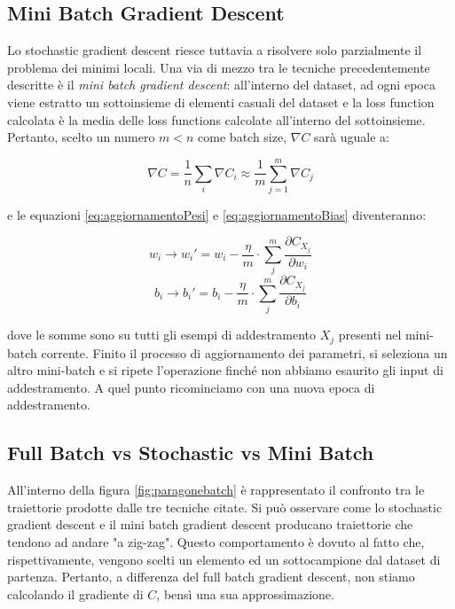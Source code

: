 \subsection{Mini Batch Gradient Descent}
Lo stochastic gradient descent riesce tuttavia a risolvere solo parzialmente il 
problema dei minimi locali.
Una via di mezzo tra le tecniche precedentemente descritte è il \textit{mini batch 
gradient descent}\cite{GradientDescent_NeuralNetworks, LearningRate_optimizer}: all’interno del dataset, ad ogni epoca viene estratto un 
sottoinsieme di elementi casuali del dataset e la loss function calcolata è la media 
delle loss functions calcolate all’interno del sottoinsieme. Pertanto, scelto 
un numero $m < n$ come batch size, $\nabla C$ sarà uguale a:

\begin{equation}
    \nabla C = \frac{1}{n}\sum_{i} \nabla C_i \approx \frac{1}{m}\sum_{j=1}^{m} \nabla C_j
\end{equation}

e le equazioni \eqref{eq:aggiornamentoPesi} e \eqref{eq:aggiornamentoBias} 
diventeranno:

\begin{equation}
    w_i \to w_i' = w_i - \frac{\eta}{m} \cdot \sum_{j}^{m} \frac{\partial C_{X_j}}{\partial w_i} %
\end{equation}
\begin{equation}
    b_i \to b_i' = b_i - \frac{\eta}{m} \cdot \sum_{j}^{m} \frac{\partial C_{X_j}}{\partial b_i} %
\end{equation}

dove le somme sono su tutti gli esempi di addestramento $X_j$ presenti nel mini-batch corrente.
Finito il processo di aggiornamento dei parametri, si seleziona un altro mini-batch e si 
ripete l'operazione finché non abbiamo esaurito gli input di addestramento. 
A quel punto ricominciamo con una nuova epoca di addestramento.

\subsection{Full Batch vs Stochastic vs Mini Batch}
All’interno della figura \ref{fig:paragonebatch} è rappresentato il confronto tra le traiettorie prodotte 
dalle tre tecniche citate. Si può osservare come lo stochastic gradient descent e il mini 
batch gradient descent producano traiettorie che tendono ad andare "a zig-zag". Questo 
comportamento è dovuto al fatto che, rispettivamente, vengono scelti un elemento ed 
un sottocampione dal dataset di partenza. Pertanto, a differenza del full batch gradient 
descent, non stiamo calcolando il gradiente di $C$, bensì una sua approssimazione.

